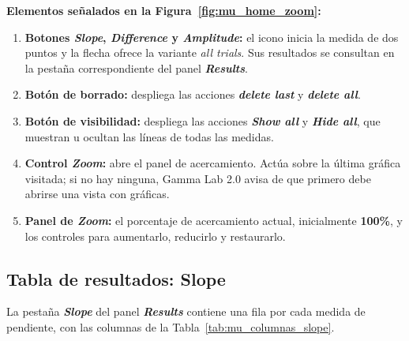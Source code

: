 \documentclass[11pt,a4paper]{article}
\newenvironment{senalamientos}[1]{%
  \par\noindent\textbf{Elementos se\~nalados en la Figura~\ref{#1}:}%
  \begin{enumerate}[label=(\arabic*),leftmargin=2.4em,itemsep=2pt,topsep=4pt]}
  {\end{enumerate}}
\begin{document}
    \begin{senalamientos}{fig:mu_home_zoom}
        \item \textbf{Botones \textit{Slope}, \textit{Difference} y \textit{Amplitude}:} el icono inicia la medida de dos puntos y la flecha ofrece la variante \textit{all trials}. Sus resultados se consultan en la pesta\~na correspondiente del panel \textbf{\textit{Results}}.
        \item \textbf{Bot\'on de borrado:} despliega las acciones \textbf{\textit{delete last}} y \textbf{\textit{delete all}}.
        \item \textbf{Bot\'on de visibilidad:} despliega las acciones \textbf{\textit{Show all}} y \textbf{\textit{Hide all}}, que muestran u ocultan las l\'ineas de todas las medidas.
        \item \textbf{Control \textit{Zoom}:} abre el panel de acercamiento. Act\'ua sobre la \'ultima gr\'afica visitada; si no hay ninguna, Gamma Lab 2.0 avisa de que primero debe abrirse una vista con gr\'aficas.
        \item \textbf{Panel de \textit{Zoom}:} el porcentaje de acercamiento actual, inicialmente \textbf{100\%}, y los controles para aumentarlo, reducirlo y restaurarlo.
    \end{senalamientos}

    \subsection{Tabla de resultados: Slope}
    La pesta\~na \textbf{\textit{Slope}} del panel \textbf{\textit{Results}} contiene una fila por cada medida de pendiente, con las columnas de la Tabla~\ref{tab:mu_columnas_slope}.
\end{document}
